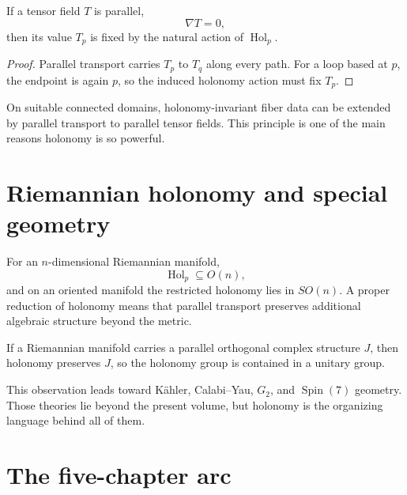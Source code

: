 \begin{theorem}\label{thm:vii25-parallel-invariant}
If a tensor field \(T\) is parallel,
\[
\nabla T=0,
\]
then its value \(T_p\) is fixed by the natural action of
\(\operatorname{Hol}_p\).
\end{theorem}

\begin{proof}
Parallel transport carries \(T_p\) to \(T_q\) along every path.  For a loop based
at \(p\), the endpoint is again \(p\), so the induced holonomy action must fix
\(T_p\).
\end{proof}

\begin{remark}\label{rem:vii25-reverse}
On suitable connected domains, holonomy-invariant fiber data can be extended by
parallel transport to parallel tensor fields.  This principle is one of the main
reasons holonomy is so powerful.
\end{remark}

\section{Riemannian holonomy and special geometry}

For an \(n\)-dimensional Riemannian manifold,
\[
\operatorname{Hol}_p\subseteq O(n),
\]
and on an oriented manifold the restricted holonomy lies in \(SO(n)\).  A proper
reduction of holonomy means that parallel transport preserves additional algebraic
structure beyond the metric.

\begin{example}\label{ex:vii25-complex}
If a Riemannian manifold carries a parallel orthogonal complex structure \(J\),
then holonomy preserves \(J\), so the holonomy group is contained in a unitary
group.
\end{example}

\begin{remark}
This observation leads toward Kähler, Calabi--Yau, \(G_2\), and
\(\operatorname{Spin}(7)\) geometry.  Those theories lie beyond the present volume,
but holonomy is the organizing language behind all of them.
\end{remark}

\section{The five-chapter arc}

